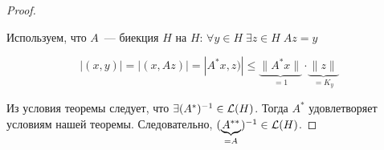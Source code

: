 \begin{proof}
\begin{itemize}
        Используем, что $A$~--- биекция $H$ на $H$: $\forall y \in H \; \exists z \in H \; Az = y$

        \[ |(x, y)| = |(x, Az)| = |A^*x, z)| \leq \underbrace{\|A^* x\|}_{=1} \cdot \underbrace{\|z\|}_{=K_y}\]
    \end{itemize}
    
    Из условия теоремы следует, что $\exists (A^*)^{-1} \in \mathcal{L}(H)$.
    Тогда $A^*$ удовлетворяет условиям нашей теоремы.
    Следовательно, $(\underbrace{A^{**}}_{=A})^{-1} \in \mathcal{L}(H)$.
\end{proof}